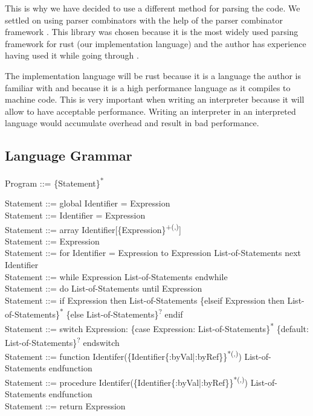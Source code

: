 \documentclass{article}
\begin{document}
This is why we have decided to use a different method for parsing the code. We
settled on using parser combinators with the help of the parser combinator
framework \textcite{nom}. This library was chosen because it is the most widely used
parsing framework for rust (our implementation language) and the author has
experience having used it while going through \textcite{eopl}.

The implementation language will be rust because it is a language the author is
familiar with and because it is a high performance language as it compiles to
machine code. This is very important when writing an interpreter because it
will allow to have acceptable performance. Writing an interpreter in an
interpreted language would accumulate overhead and result in bad performance.

\subsection{Language Grammar}

\noindent
Program ::= \{Statement\}\textsuperscript{*}

\noindent
Statement ::= global Identifier = Expression\\
Statement ::= Identifier = Expression\\
Statement ::= array Identifier[\{Expression\}\textsuperscript{+(,)}]\\
Statement ::= Expression\\
Statement ::= for Identifier = Expression to Expression List-of-Statements next Identifier\\
Statement ::= while Expression List-of-Statements endwhile\\
Statement ::= do List-of-Statements until Expression\\

\noindent
Statement ::= if Expression then List-of-Statements \{elseif Expression then List-of-Statements\}\textsuperscript{*} \{else List-of-Statements\}\textsuperscript{?} endif\\
Statement ::= switch Expression: \{case Expression: List-of-Statements\}\textsuperscript{*} \{default: List-of-Statements\}\textsuperscript{?} endswitch\\

\noindent
Statement ::= function Identifer(\{Identifier\{:byVal|:byRef\}\}\textsuperscript{*(,)}) List-of-Statements endfunction\\
Statement ::= procedure Identifer(\{Identifier\{:byVal|:byRef\}\}\textsuperscript{*(,)}) List-of-Statements endfunction\\
Statement ::= return Expression\\
\end{document}
